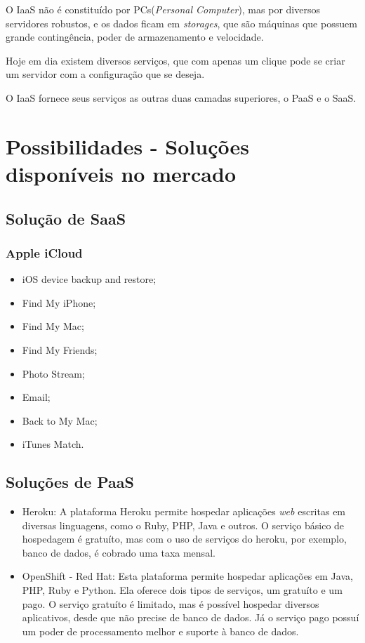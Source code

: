 \documentclass{abnt}
\begin{document}
		O IaaS não é constituído por PCs(\textit{Personal Computer}), mas por diversos servidores robustos, e os dados ficam em \textit{storages}, que são máquinas que possuem grande contingência, poder de armazenamento e velocidade.
		
		Hoje em dia existem diversos serviços, que com apenas um clique pode se criar um servidor com a configuração que se deseja.
		
		O IaaS fornece seus serviços as outras duas camadas superiores, o PaaS e o SaaS.
		 
	\chapter{Possibilidades - Soluções disponíveis no mercado}

	\section{Solução de SaaS}

	\subsection{Apple iCloud}

	\begin{itemize}
	  \item iOS device backup and restore;
	  \item Find My iPhone;
	  \item Find My Mac;
	  \item Find My Friends;
	  \item Photo Stream;
	  \item Email;
	  \item Back to My Mac;
	  \item iTunes Match.
	\end{itemize}
	\section{Soluções de PaaS}

		\begin{itemize}
			\item Heroku: A plataforma Heroku permite hospedar aplicações \textit{web} escritas em diversas linguagens, como o Ruby, PHP, Java e outros. O serviço básico de hospedagem é gratuíto, mas com o uso de serviços do heroku, por exemplo, banco de dados, é cobrado uma taxa mensal.
			\item OpenShift - Red Hat: Esta plataforma permite hospedar aplicações em Java, PHP, Ruby e Python. Ela oferece dois tipos de serviços, um gratuíto e um pago. O serviço gratuíto é limitado, mas é possível hospedar diversos aplicativos, desde que não precise de banco de dados. Já o serviço pago possuí um poder de processamento melhor e suporte à banco de dados.
		\end{itemize}
\end{document}
